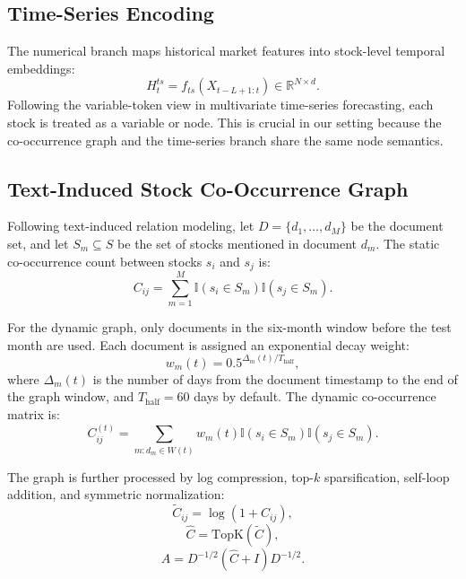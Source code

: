 \documentclass[11pt]{article}
\begin{document}
\subsection{Time-Series Encoding}

The numerical branch maps historical market features into stock-level temporal embeddings:
\begin{equation}
H_t^{ts} = f_{ts}(X_{t-L+1:t}) \in \mathbb{R}^{N \times d}.
\end{equation}
Following the variable-token view in multivariate time-series forecasting, each stock is treated as a variable or node. This is crucial in our setting because the co-occurrence graph and the time-series branch share the same node semantics.

\subsection{Text-Induced Stock Co-Occurrence Graph}

Following text-induced relation modeling, let $D = \{d_1, \dots, d_M\}$ be the document set, and let $S_m \subseteq S$ be the set of stocks mentioned in document $d_m$. The static co-occurrence count between stocks $s_i$ and $s_j$ is:
\begin{equation}
C_{ij} = \sum_{m=1}^{M} \mathbb{I}(s_i \in S_m)\mathbb{I}(s_j \in S_m).
\end{equation}

For the dynamic graph, only documents in the six-month window before the test month are used. Each document is assigned an exponential decay weight:
\begin{equation}
w_m(t) = 0.5^{\Delta_m(t)/T_{\text{half}}},
\end{equation}
where $\Delta_m(t)$ is the number of days from the document timestamp to the end of the graph window, and $T_{\text{half}} = 60$ days by default. The dynamic co-occurrence matrix is:
\begin{equation}
C^{(t)}_{ij} = \sum_{m : d_m \in W(t)} w_m(t)\mathbb{I}(s_i \in S_m)\mathbb{I}(s_j \in S_m).
\end{equation}

The graph is further processed by log compression, top-$k$ sparsification, self-loop addition, and symmetric normalization:
\begin{equation}
\tilde{C}_{ij} = \log(1 + C_{ij}),
\end{equation}
\begin{equation}
\hat{C} = \text{TopK}(\tilde{C}),
\end{equation}
\begin{equation}
A = D^{-1/2}(\hat{C}+I)D^{-1/2}.
\end{equation}
\end{document}

